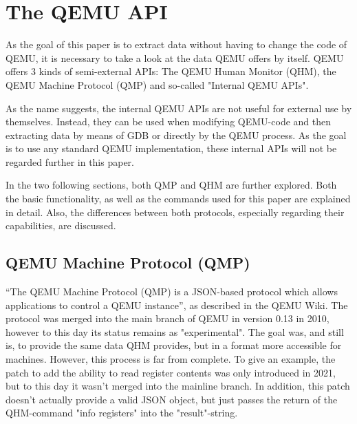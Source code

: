 
\chapter{The QEMU API} \label{chap:QEMU_API}
As the goal of this paper is to extract data without having to change the code of QEMU,
it is necessary to take a look at the data QEMU offers by itself.
QEMU offers 3 kinds of semi-external APIs: The QEMU Human Monitor (QHM),
the QEMU Machine Protocol (QMP) and so-called "Internal QEMU APIs"\cite{internal}.

As the name suggests, the internal QEMU APIs are not useful for external use by themselves.
Instead, they can be used when modifying QEMU-code and then extracting data by means of GDB or directly by the QEMU process.
As the goal is to use any standard QEMU implementation, these internal APIs will not be regarded further in this paper.

In the two following sections, both QMP and QHM are further explored. Both the basic functionality,
as well as the commands used for this paper are explained in detail.
Also, the differences between both protocols, especially regarding their capabilities,
are discussed.

\section{QEMU Machine Protocol (QMP)} \label{sec:QMP}
\enquote{The QEMU Machine Protocol (QMP) is a JSON-based protocol which allows applications to control a QEMU instance}\cite{qmp-description}, as described in the QEMU Wiki.
The protocol was merged into the main branch of QEMU in version 0.13 in 2010, however to this day its status remains as "experimental"\cite{qmp-merge}.
The goal was, and still is, to provide the same data QHM provides, but in a format more accessible for machines.
However, this process is far from complete. To give an example, the patch to add the ability to read register contents was only introduced in 2021,
but to this day it wasn't merged into the mainline branch.
In addition, this patch doesn't actually provide a valid JSON object, but just passes the return of the QHM-command "info registers" into the "result"-string\cite{qmp-registers-patch}.

